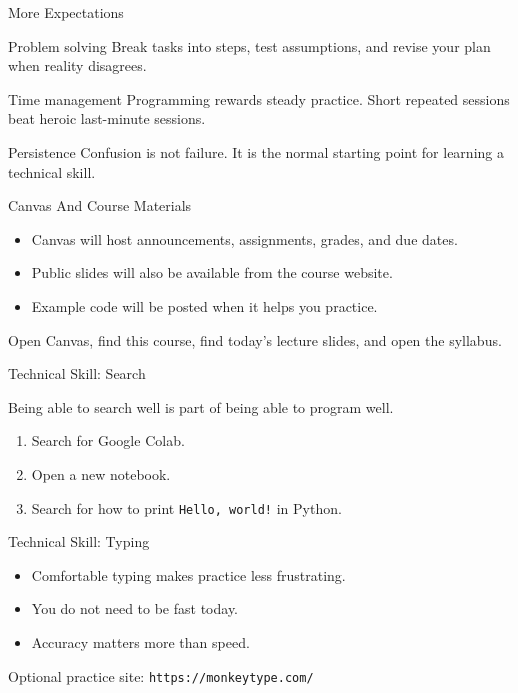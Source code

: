 \documentclass[aspectratio=169]{beamer}
\begin{document}
\begin{frame}{More Expectations}
  \begin{block}{Problem solving}
    Break tasks into steps, test assumptions, and revise your plan when reality disagrees.
  \end{block}
  \begin{block}{Time management}
    Programming rewards steady practice. Short repeated sessions beat heroic last-minute sessions.
  \end{block}
  \begin{block}{Persistence}
    Confusion is not failure. It is the normal starting point for learning a technical skill.
  \end{block}
\end{frame}

\begin{frame}{Canvas And Course Materials}
  \begin{itemize}
    \item Canvas will host announcements, assignments, grades, and due dates.
    \item Public slides will also be available from the course website.
    \item Example code will be posted when it helps you practice.
  \end{itemize}
  \vspace{0.18in}
  \begin{activity}
    Open Canvas, find this course, find today's lecture slides, and open the syllabus.
  \end{activity}
\end{frame}


\begin{frame}{Technical Skill: Search}
  \begin{keyidea}
    Being able to search well is part of being able to program well.
  \end{keyidea}
  \begin{enumerate}
    \item Search for Google Colab.
    \item Open a new notebook.
    \item Search for how to print \texttt{Hello, world!} in Python.
  \end{enumerate}
\end{frame}

\begin{frame}{Technical Skill: Typing}
  \begin{itemize}
    \item Comfortable typing makes practice less frustrating.
    \item You do not need to be fast today.
    \item Accuracy matters more than speed.
  \end{itemize}
  \vspace{0.15in}
  \begin{exampleblockcp}
    Optional practice site: \texttt{https://monkeytype.com/}
  \end{exampleblockcp}
\end{frame}
\end{document}
